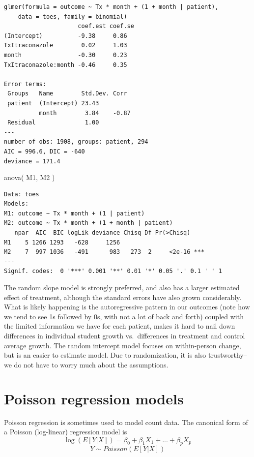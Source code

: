 \documentclass[
  letterpaper,
  DIV=11,
  numbers=noendperiod]{scrreprt}
\newenvironment{Shaded}{}{}
\newcommand{\FunctionTok}[1]{\textcolor[rgb]{0.02,0.16,0.49}{#1}}
\newcommand{\NormalTok}[1]{#1}
\begin{document}
\begin{verbatim}
glmer(formula = outcome ~ Tx * month + (1 + month | patient), 
    data = toes, family = binomial)
                     coef.est coef.se
(Intercept)          -9.38     0.86  
TxItraconazole        0.02     1.03  
month                -0.30     0.23  
TxItraconazole:month -0.46     0.35  

Error terms:
 Groups   Name        Std.Dev. Corr  
 patient  (Intercept) 23.43          
          month        3.84    -0.87 
 Residual              1.00          
---
number of obs: 1908, groups: patient, 294
AIC = 996.6, DIC = -640
deviance = 171.4 
\end{verbatim}

\begin{Shaded}
\begin{Highlighting}[]
\FunctionTok{anova}\NormalTok{( M1, M2 )}
\end{Highlighting}
\end{Shaded}

\begin{verbatim}
Data: toes
Models:
M1: outcome ~ Tx * month + (1 | patient)
M2: outcome ~ Tx * month + (1 + month | patient)
   npar  AIC  BIC logLik deviance Chisq Df Pr(>Chisq)    
M1    5 1266 1293   -628     1256                        
M2    7  997 1036   -491      983   273  2     <2e-16 ***
---
Signif. codes:  0 '***' 0.001 '**' 0.01 '*' 0.05 '.' 0.1 ' ' 1
\end{verbatim}

The random slope model is strongly preferred, and also has a larger
estimated effect of treatment, although the standard errors have also
grown considerably. What is likely happening is the autoregressive
pattern in our outcomes (note how we tend to see 1s followed by 0s, with
not a lot of back and forth) coupled with the limited information we
have for each patient, makes it hard to nail down differences in
individual student growth vs.~differences in treatment and control
average growth. The random intercept model focuses on within-person
change, but is an easier to estimate model. Due to randomization, it is
also trustworthy--we do not have to worry much about the assumptions.

\section{Poisson regression models}\label{poisson-regression-models}

Poisson regression is sometimes used to model count data. The canonical
form of a Poisson (log-linear) regression model is
\[\log(E[Y|X]) = \beta_0 + \beta_1X_1 + ... + \beta_pX_p\]
\[Y \sim Poisson(E[Y|X])\]
\end{document}
